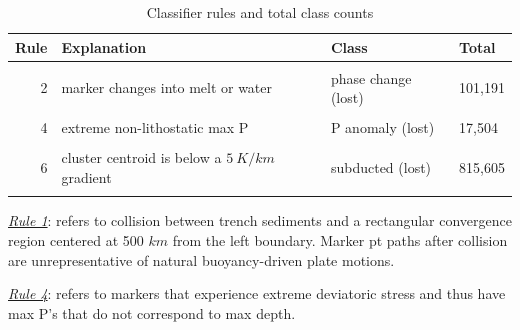 \begin{landscape}\begin{table}

\caption{\label{tab:rules}Classifier rules and total class counts}
\centering
\begin{threeparttable}
\begin{tabular}[t]{rlll}
\toprule
Rule & Explanation & Class & Total\\
\midrule
\cellcolor{gray!6}{1} & \cellcolor{gray!6}{max P is reached after collision with convergence region} & \cellcolor{gray!6}{collision (lost)} & \cellcolor{gray!6}{188,603}\\
2 & marker changes into melt or water & phase change (lost) & 101,191\\
\cellcolor{gray!6}{3} & \cellcolor{gray!6}{T never exceeds 50 $^\circ$C} & \cellcolor{gray!6}{T anomaly (lost)} & \cellcolor{gray!6}{4,176}\\
4 & extreme non-lithostatic max P & P anomaly (lost) & 17,504\\
\cellcolor{gray!6}{5} & \cellcolor{gray!6}{max P is 7.5$\sigma$ above the mean (recovered) max P} & \cellcolor{gray!6}{P anomaly (lost)} & \cellcolor{gray!6}{90}\\
6 & cluster centroid is below a $5\ K/km$ gradient & subducted (lost) & 815,605\\
\cellcolor{gray!6}{7} & \cellcolor{gray!6}{none of the above} & \cellcolor{gray!6}{recovered} & \cellcolor{gray!6}{91,733}\\
\bottomrule
\end{tabular}
\begin{tablenotes}
\item \uline{\textit{Rule 1}}: refers to collision between trench sediments and a rectangular convergence region centered at 500 $km$ from the left boundary. Marker \gls{pt} paths after collision are unrepresentative of natural buoyancy-driven plate motions.
\item \uline{\textit{Rule 4}}: refers to markers that experience extreme deviatoric stress and thus have max P's that do not correspond to max depth.
\end{tablenotes}
\end{threeparttable}
\end{table}
\end{landscape}



